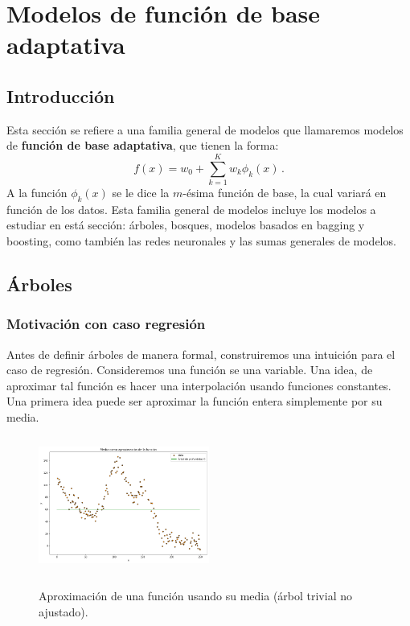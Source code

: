 \section{Modelos de función de base adaptativa}
\label{cap:adaptativa}

\subsection{Introducción}
\label{sec:intro_adap}

Esta sección se refiere a una familia general de modelos que llamaremos modelos de \textbf{función de base adaptativa}, que tienen la forma:
\begin{equation}
    f(x) = w_0 + \sum^K_{k=1} w_k \phi_k(x) \,. 
\end{equation}
A la función $\phi_k(x)$ se le dice la $m$-ésima función de base, la cual variará en función de los datos. Esta familia general de modelos incluye los modelos a estudiar en está sección: árboles, bosques, modelos basados en bagging y boosting, como también las redes neuronales y las sumas generales de modelos.


\subsection{Árboles}
\label{sec:arbol}

\subsubsection{Motivación con caso regresión}

Antes de definir árboles de manera formal, construiremos una intuición para el caso de regresión. Consideremos una función se una variable. Una idea, de aproximar tal función es hacer una interpolación usando funciones constantes. Una primera idea puede ser aproximar la función entera simplemente por su media.

\begin{figure}[h]
	\centering
	\includegraphics[width=0.5\textwidth, height=4.5cm]{img/capN_arbol_trivial.png}\\
	\caption{Aproximación de una función usando su media (árbol trivial no ajustado).}
\end{figure}

